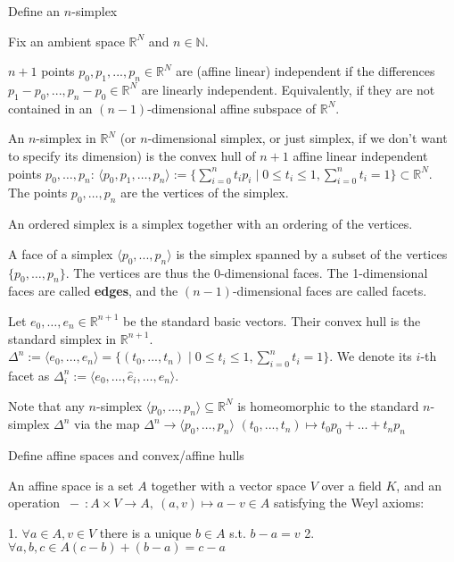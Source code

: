 Define an \( n \)-simplex

Fix an ambient space \(\mathbb{R}^N\) and \(n \in \mathbb{N}\). 

\(n+1\) points \(p_0, p_1, ... , p_n \in \mathbb{R}^N\) are (affine linear) independent if the differences \(p_1 - p_0, ... , p_n - p_0 \in \mathbb{R}^N\) are linearly independent. 
Equivalently, if they are not contained in an \((n-1)\)-dimensional affine subspace of \(\mathbb{R}^N\).

An \(n\)-simplex in \(\mathbb{R}^N\) (or \(n\)-dimensional simplex, or just simplex, if we don't want to specify its dimension) is the convex hull of \(n+1\) affine linear independent points 
\(p_0, \dots, p_n\): 
\(\langle p_0, p_1, \dots, p_n \rangle := \{ \sum_{i=0}^n t_i p_i \mid 0 \leq t_i \leq 1, \sum_{i=0}^n t_i = 1 \} \subset \mathbb{R}^N.\)
The points \(p_0, \dots, p_n\) are the vertices of the simplex.

An ordered simplex is a simplex together with an ordering of the vertices.

A face of a simplex \(\langle p_0, ... , p_n \rangle\) is the simplex spanned by a subset of the vertices \(\{ p_0, \dots, p_n \}\). The vertices are thus the 0-dimensional faces. 
The 1-dimensional faces are called \textbf{edges}, and the \((n-1)\)-dimensional faces are called facets.

Let \(e_0, \dots, e_n \in \mathbb{R}^{n+1}\) be the standard basic vectors. Their convex hull is the standard simplex in \(\mathbb{R}^{n+1}\).
\(\Delta^n := \langle e_0, \dots, e_n \rangle = \{ (t_0, ... , t_n) \mid 0 \leq t_i \leq 1, \sum_{i=0}^n t_i = 1 \}.\) 
We denote its \(i\)-th facet as 
\(\Delta_i^n := \langle e_0, \dots, \hat{e}_i , \dots, e_n \rangle.\)

Note that any \(n\)-simplex \(\langle p_0, \dots, p_n \rangle \subseteq \mathbb{R}^N\) is homeomorphic to the standard \(n\)-simplex \(\Delta^n\) via the map
\(\Delta^n \rightarrow \langle p_0, \dots, p_n \rangle\)
\((t_0, ... , t_n) \mapsto t_0 p_0 + \dots + t_n p_n\) 


Define affine spaces and convex/affine hulls

An affine space is a set \(A\) together with a vector space \(V\) over a field \(K\), and an operation 
\(\ -\ : A \times V \to A,\ (a, v) \mapsto a - v \in A \)
satisfying the Weyl axioms:

1. \( \forall a \in A, v \in V \) there is a unique \( b \in A \) s.t. \( b - a = v \)
2. \( \forall a, b, c \in A (c-b) + (b-a) = c-a \)

